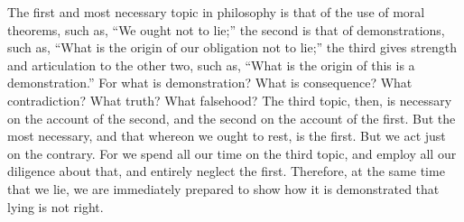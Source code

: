 The  first and  most  necessary topic  in  philosophy  is that  of  the use  of
moral  theorems, such  as, ``We  ought  not to  lie;''  the second  is that  of
demonstrations, such as,  ``What is the origin of our  obligation not to lie;''
the third gives strength and articulation to  the other two, such as, ``What is
the origin  of this is  a demonstration.'' For  what is demonstration?  What is
consequence? What contradiction?  What truth? What falsehood?  The third topic,
then, is necessary on the account of  the second, and the second on the account
of the first. But the most necessary, and that whereon we ought to rest, is the
first. But we act just on the contrary.  For we spend all our time on the third
topic, and employ all our diligence about that, and entirely neglect the first.
Therefore, at the  same time that we  lie, we are immediately  prepared to show
how it is demonstrated that lying is not right.

